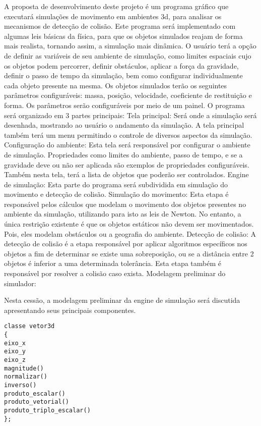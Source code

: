 A  proposta de desenvolvimento deste projeto é um programa gráfico que
executará simulações de movimento em ambientes 3d, para analisar os mecanismos de detecção de colisão.
Este programa será implementado com algumas leis básicas da física, para que os objetos simulados reajam de forma mais realista,  tornando assim, a simulação mais dinâmica.
O usuário terá a opção de definir as variáveis de seu ambiente de simulação, como limites espaciais cujo os objetos podem percorrer, definir obstáculos, aplicar a força da gravidade,
definir o passo de tempo da simulação, bem como configurar individualmente cada
objeto presente na mesma.
Os objetos simulados terão os seguintes parâmetros configuráveis: massa,
posição, velocidade, coeficiente de restituição e forma. Os parâmetros serão configuráveis por meio de um painel.
O programa será organizado em 3 partes principais:
Tela principal:
Será onde a simulação será desenhada, mostrando ao usuário o andamento da simulação.
A tela principal também terá um menu permitindo o controle de diversos aspectos da simulação.
Configuração do ambiente:
Esta tela será responsável por configurar o ambiente de simulação. Propriedades
como limites do ambiente, passo de tempo, e se a gravidade deve ou não ser
aplicada são exemplos de propriedades configuráveis.
Também nesta tela, terá a lista de objetos que poderão ser controlados.
Engine de simulação:
Esta parte do programa será subdividida em simulação do movimento e detecção de colisão.
Simulação do movimento:
Esta etapa é responsável pelos cálculos que modelam o movimento dos objetos presentes no ambiente da simulação, utilizando para isto as leis de Newton.
No entanto, a  única restrição existente é que os objetos estáticos não devem ser movimentados. Pois, eles modelam obstáculos ou a geografia do ambiente.
Detecção de colisão:
A detecção de colisão é a etapa responsável por aplicar algoritmos específicos nos objetos a fim de determinar se existe uma sobreposição, ou se  a distância entre 2 objetos é inferior a uma determinada tolerância.
Esta etapa também é responsável por resolver a colisão caso exista.
Modelagem preliminar do simulador:

Nesta cessão, a modelagem preliminar da engine de simulação será discutida apresentando seus principais componentes.

\begin{lstlisting}[frame=single,caption=Código de exemplo\label{codigo1}]
classe vetor3d
{
eixo_x
eixo_y
eixo_z
magnitude()
normalizar()
inverso()
produto_escalar()
produto_vetorial()
produto_triplo_escalar()
};
\end{lstlisting}


